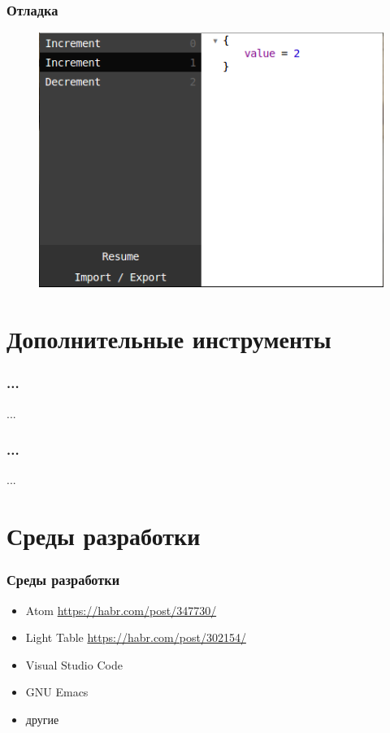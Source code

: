 \documentclass[11pt,aspectratio=169]{beamer}
\begin{document}
\begin{frame}
\frametitle{Отладка}
\begin{figure}
	\includegraphics[scale=0.5]{elm-app-sample-state-previous}
\end{figure}
\end{frame}

\section{Дополнительные инструменты}

\begin{frame}
\frametitle{...}
...
\end{frame}

\begin{frame}
\frametitle{...}
...
\end{frame}

\section{Среды разработки}

\begin{frame}
\frametitle{Среды разработки}
\begin{itemize}
	\item Atom \url{https://habr.com/post/347730/}
	\item Light Table \url{https://habr.com/post/302154/}
	\item Visual Studio Code
	\item GNU Emacs
	\item другие
\end{itemize}
\end{frame}
\end{document}
